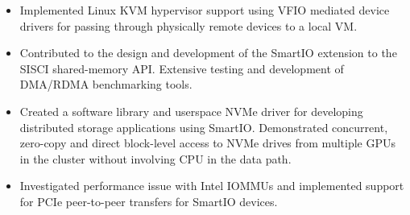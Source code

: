 {	\bigskip
	\begin{itemize}
		\item{Implemented Linux KVM hypervisor support using VFIO mediated device drivers
			for passing through physically remote devices to a local VM.}\\[-.6em]
		\item{Contributed to the design and development of the SmartIO
			extension to the SISCI shared-memory API. Extensive testing and development of
			DMA/RDMA benchmarking tools.}\\[-.6em]
		\item{Created a software library and userspace NVMe driver 
			for developing distributed storage applications using SmartIO.
			Demonstrated concurrent, zero-copy and direct block-level access to NVMe drives from
			multiple GPUs in the cluster without involving CPU in the data path.}\\[-.6em]
		\item{Investigated performance issue with Intel IOMMUs and
			implemented support for PCIe peer-to-peer transfers for SmartIO devices.}\\[-.6em]
	\end{itemize}
	\bigskip
	\bigskip
}


